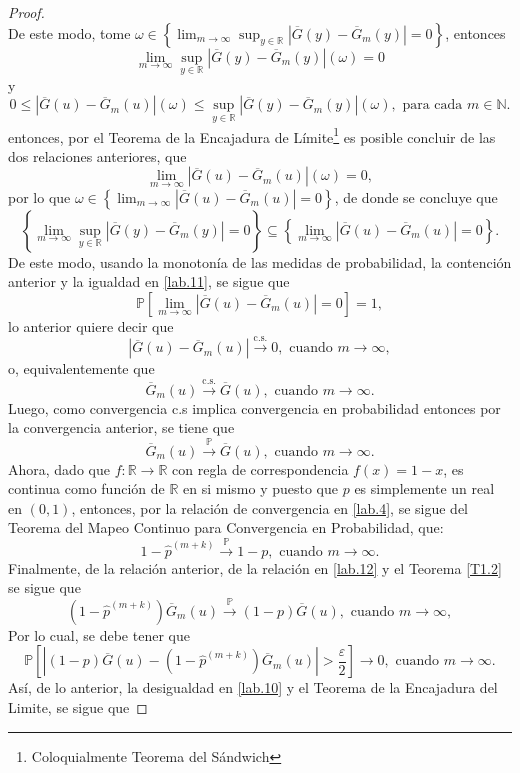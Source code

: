 \documentclass[10.5pt,notitlepage]{article}
\newcommand{\PP}{\mathbb{P}}
\newcommand{\RR}{\mathbb{R}}
\newcommand{\ee}{\varepsilon}
\newcommand{\NN}{\mathbb{N}}
\newcommand{\toPP}{\overset{\PP}{\to}}
\newcommand{\toCS}{\overset{\mathrm{c.s.}}{\to}}
\newcommand{\abs}[1]{\left\lvert #1 \right\rvert}
\newcommand{\corch}[1]{\left[ #1 \right]}
\newcommand{\kis}[1]{\left\{ #1 \right\}}
\theoremstyle{plain}
\begin{document}
\begin{proof}
\begin{equation}
\end{equation}
De este modo, tome \(\omega \in \kis{\lim_{m \to \infty}\sup_{y \in \RR}\abs{\overline{G}(y) - \overline{G}_{m}(y)} = 0}\), entonces 
\[
\lim_{m \to \infty}\sup_{y \in \RR}\abs{\overline{G}(y) - \overline{G}_{m}(y)}(\omega) = 0
\]
y
\[
0 \leq \abs{\overline{G}(u) - \overline{G}_{m}(u)}(\omega) \leq \sup_{y \in \RR}\abs{\overline{G}(y) - \overline{G}_{m}(y)}(\omega), \text{ para cada } m \in \NN.
\]
entonces, por el Teorema de la Encajadura de Límite\footnote{Coloquialmente Teorema del Sándwich} es posible concluir de las dos relaciones anteriores, que 
\[
 \lim_{m \to \infty}\abs{\overline{G}(u) - \overline{G}_{m}(u)}(\omega) = 0,
\]
por lo que \(\omega \in \kis{ \lim_{m \to \infty}\abs{\overline{G}(u) - \overline{G}_{m}(u)} = 0}\), de donde se concluye que 
\[
\kis{\lim_{m \to \infty}\sup_{y \in \RR}\abs{\overline{G}(y) - \overline{G}_{m}(y)} = 0}\subseteq \kis{\lim_{m \to \infty}\abs{\overline{G}(u) - \overline{G}_{m}(u)} = 0}.
\]
De este modo, usando la monotonía de las medidas de probabilidad, la contención anterior y la igualdad en \eqref{lab.11}, se sigue que 
\[
\PP\corch{\lim_{m \to \infty}\abs{\overline{G}(u) - \overline{G}_{m}(u)} = 0} = 1, 
\]
lo anterior quiere decir que 
\[
\abs{\overline{G}(u) - \overline{G}_{m}(u)} \toCS 0, \text{ cuando } m \to \infty,
\]
o, equivalentemente que 
\[
 \overline{G}_{m}(u) \toCS \overline{G}(u),  \text{ cuando } m \to \infty.
\]
Luego, como convergencia c.s implica convergencia en probabilidad entonces por la convergencia anterior, se tiene que
\begin{equation}\label{lab.12}
   \overline{G}_{m}(u) \toPP \overline{G}(u),  \text{ cuando } m \to \infty.  
\end{equation}
Ahora, dado que \(f:\RR\to \RR\) con regla de correspondencia \(f(x) = 1 - x\), es continua como función de \(\RR\) en si mismo y puesto que \(p\) es simplemente un real en \((0,1)\), entonces, por la relación de convergencia en \eqref{lab.4}, se sigue del Teorema del Mapeo Continuo para Convergencia en Probabilidad, que:
 \[
 1 - \hat{p}^{(m+k)} \toPP 1 - p, \text{ cuando } m \to \infty.
 \]
 Finalmente, de la relación anterior, de la relación en \eqref{lab.12} y el Teorema \ref{T1.2} se sigue que 
 \[
  (1 - \hat{p}^{(m+k)})\overline{G}_{m}(u) \toPP (1 - p)\overline{G}(u), \text{ cuando } m \to \infty,
 \]
 Por lo cual, se debe tener que 
 \[
  \PP\corch{ \abs{(1-p)\overline{G}(u)- (1 - \hat{p}^{(m+k)})\overline{G}_{m}(u)} > \frac{\ee}{2}} \to 0, \text{ cuando } m \to \infty.
 \]
 Así, de lo anterior, la desigualdad en \eqref{lab.10} y el Teorema de la Encajadura del Limite, se sigue que 

\end{proof}
\end{document}
